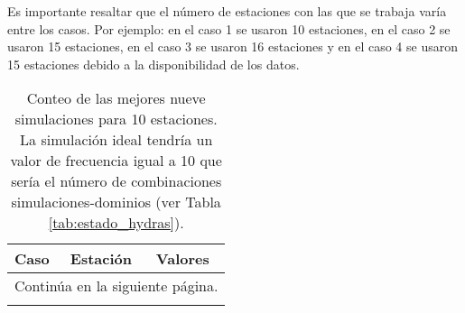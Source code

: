 \begin{itemize}
Es importante resaltar que el número de estaciones con las que se trabaja varía entre los casos. Por ejemplo: en el caso 1 se usaron 10 estaciones, en el caso 2 se usaron 15 estaciones, en el caso 3 se usaron 16 estaciones y en el caso 4 se usaron 15 estaciones debido a la disponibilidad de los datos.\\


\begin{longtable}{lll}

\caption{Conteo de las mejores nueve simulaciones para 10 estaciones. La simulación ideal tendría un valor de frecuencia igual a 10 que sería el número de combinaciones simulaciones-dominios (ver Tabla \ref{tab:estado_hydras}).}
\label{tab_estaciones_5_tiempo}\\
\hline
Caso & Estación & Valores \\

\midrule
\endhead
\midrule
\multicolumn{3}{r}{{Continúa en la siguiente página.}} \\
\midrule
\endfoot

\bottomrule
\endlastfoot


\end{longtable}
\end{itemize}

